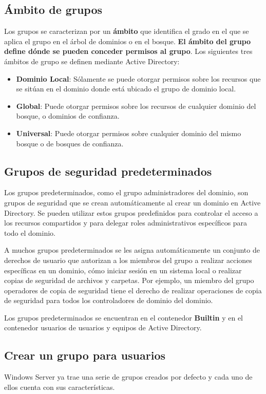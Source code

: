 \subsection{Ámbito de grupos}
Los grupos se caracterizan por un \textbf{ámbito} que identifica el grado en el que se aplica el grupo en el árbol de dominios o en el bosque. \textbf{El ámbito del grupo define dónde se pueden conceder permisos al grupo}. Los siguientes tres ámbitos de grupo se definen mediante Active Directory:

\begin{itemize}
    \item \textbf{Dominio Local}: Sólamente se puede otorgar permisos sobre los recursos que se sitúan en el dominio donde está ubicado el grupo de dominio local.
    \item \textbf{Global}: Puede otorgar permisos sobre los recursos de cualquier dominio del bosque, o dominios de confianza.
    \item \textbf{Universal}: Puede otorgar permisos sobre cualquier dominio del mismo bosque o de bosques de confianza.
\end{itemize}

\subsection{Grupos de seguridad predeterminados}
Los grupos predeterminados, como el grupo administradores del dominio, son grupos de seguridad que se crean automáticamente al crear un dominio en Active Directory. Se pueden utilizar estos grupos predefinidos para controlar el acceso a los recursos compartidos y para delegar roles administrativos específicos para todo el dominio.

A muchos grupos predeterminados se les asigna automáticamente un conjunto de derechos de usuario que autorizan a los miembros del grupo a realizar acciones específicas en un dominio, cómo iniciar sesión en un sistema local o realizar copias de seguridad de archivos y carpetas. Por ejemplo, un miembro del grupo operadores de copia de seguridad tiene el derecho de realizar operaciones de copia de seguridad para todos los controladores de dominio del dominio.

Los grupos predeterminados se encuentran en el contenedor \textbf{Builtin} y en el contenedor usuarios de usuarios y equipos de Active Directory.


\subsection{Crear un grupo para usuarios}
Windows Server ya trae una serie de grupos creados por defecto y cada uno de ellos cuenta con sus características.

